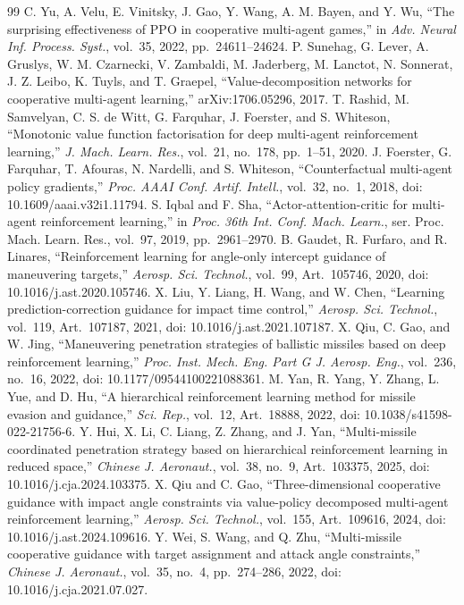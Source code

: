 \documentclass{cja}
\begin{document}
\begin{thebibliography}{99}
C. Yu, A. Velu, E. Vinitsky, J. Gao, Y. Wang, A. M. Bayen, and Y. Wu, ``The surprising effectiveness of PPO in cooperative multi-agent games,'' in \textit{Adv. Neural Inf. Process. Syst.}, vol.~35, 2022, pp.~24611--24624.
P. Sunehag, G. Lever, A. Gruslys, W. M. Czarnecki, V. Zambaldi, M. Jaderberg, M. Lanctot, N. Sonnerat, J. Z. Leibo, K. Tuyls, and T. Graepel, ``Value-decomposition networks for cooperative multi-agent learning,'' arXiv:1706.05296, 2017.
T. Rashid, M. Samvelyan, C. S. de Witt, G. Farquhar, J. Foerster, and S. Whiteson, ``Monotonic value function factorisation for deep multi-agent reinforcement learning,'' \textit{J. Mach. Learn. Res.}, vol.~21, no.~178, pp.~1--51, 2020.
J. Foerster, G. Farquhar, T. Afouras, N. Nardelli, and S. Whiteson, ``Counterfactual multi-agent policy gradients,'' \textit{Proc. AAAI Conf. Artif. Intell.}, vol.~32, no.~1, 2018, doi: 10.1609/aaai.v32i1.11794.
S. Iqbal and F. Sha, ``Actor-attention-critic for multi-agent reinforcement learning,'' in \textit{Proc. 36th Int. Conf. Mach. Learn.}, ser. Proc. Mach. Learn. Res., vol.~97, 2019, pp.~2961--2970.
B. Gaudet, R. Furfaro, and R. Linares, ``Reinforcement learning for angle-only intercept guidance of maneuvering targets,'' \textit{Aerosp. Sci. Technol.}, vol.~99, Art.~105746, 2020, doi: 10.1016/j.ast.2020.105746.
X. Liu, Y. Liang, H. Wang, and W. Chen, ``Learning prediction-correction guidance for impact time control,'' \textit{Aerosp. Sci. Technol.}, vol.~119, Art.~107187, 2021, doi: 10.1016/j.ast.2021.107187.
X. Qiu, C. Gao, and W. Jing, ``Maneuvering penetration strategies of ballistic missiles based on deep reinforcement learning,'' \textit{Proc. Inst. Mech. Eng. Part G J. Aerosp. Eng.}, vol.~236, no.~16, 2022, doi: 10.1177/09544100221088361.
M. Yan, R. Yang, Y. Zhang, L. Yue, and D. Hu, ``A hierarchical reinforcement learning method for missile evasion and guidance,'' \textit{Sci. Rep.}, vol.~12, Art.~18888, 2022, doi: 10.1038/s41598-022-21756-6.
Y. Hui, X. Li, C. Liang, Z. Zhang, and J. Yan, ``Multi-missile coordinated penetration strategy based on hierarchical reinforcement learning in reduced space,'' \textit{Chinese J. Aeronaut.}, vol.~38, no.~9, Art.~103375, 2025, doi: 10.1016/j.cja.2024.103375.
X. Qiu and C. Gao, ``Three-dimensional cooperative guidance with impact angle constraints via value-policy decomposed multi-agent reinforcement learning,'' \textit{Aerosp. Sci. Technol.}, vol.~155, Art.~109616, 2024, doi: 10.1016/j.ast.2024.109616.
Y. Wei, S. Wang, and Q. Zhu, ``Multi-missile cooperative guidance with target assignment and attack angle constraints,'' \textit{Chinese J. Aeronaut.}, vol.~35, no.~4, pp.~274--286, 2022, doi: 10.1016/j.cja.2021.07.027.

\end{thebibliography}
\end{document}
